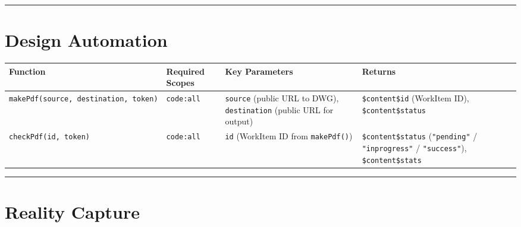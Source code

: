 \documentclass[
  11pt,
  letterpaper,
  DIV=11,
  numbers=noendperiod]{scrreprt}
\begin{document}
\begin{center}\rule{0.5\linewidth}{0.5pt}\end{center}

\section{Design Automation}\label{design-automation-1}

\begin{longtable}[]{@{}
  >{\raggedright\arraybackslash}p{}
  >{\raggedright\arraybackslash}p{}
  >{\raggedright\arraybackslash}p{}
  >{\raggedright\arraybackslash}p{}@{}}
\toprule\noalign{}
\begin{minipage}[b]{\linewidth}\raggedright
Function
\end{minipage} & \begin{minipage}[b]{\linewidth}\raggedright
Required Scopes
\end{minipage} & \begin{minipage}[b]{\linewidth}\raggedright
Key Parameters
\end{minipage} & \begin{minipage}[b]{\linewidth}\raggedright
Returns
\end{minipage} \\
\midrule\noalign{}
\endhead
\bottomrule\noalign{}
\endlastfoot
\texttt{makePdf(source,\ destination,\ token)} & \texttt{code:all} &
\texttt{source} (public URL to DWG), \texttt{destination} (public URL
for output) & \texttt{\$content\$id} (WorkItem ID),
\texttt{\$content\$status} \\
\texttt{checkPdf(id,\ token)} & \texttt{code:all} & \texttt{id}
(WorkItem ID from \texttt{makePdf()}) & \texttt{\$content\$status}
(\texttt{"pending"} / \texttt{"inprogress"} / \texttt{"success"}),
\texttt{\$content\$stats} \\
\end{longtable}

\begin{center}\rule{0.5\linewidth}{0.5pt}\end{center}

\section{Reality Capture}\label{reality-capture-1}
\end{document}
